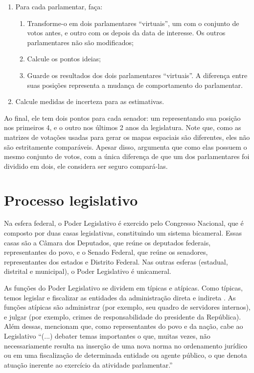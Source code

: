 \documentclass[a4paper,titlepage]{ppgi}\usepackage[]{graphicx}\usepackage[]{color}
\begin{document}
\begin{enumerate}
  \item Para cada parlamentar, faça:
    \begin{enumerate}
      \item Transforme-o em dois parlamentares ``virtuais'', um com o conjunto
de votos antes, e outro com os depois da data de interesse. Os outros
parlamentares não são modificados;
      \item Calcule os pontos ideias;
      \item Guarde os resultados dos dois parlamentares ``virtuais''. A
diferença entre suas posições representa a mudança de comportamento do
parlamentar.
    \end{enumerate}
  \item Calcule medidas de incerteza para as estimativas.
\end{enumerate}

Ao final, ele tem dois pontos para cada senador: um representando sua posição
nos primeiros 4, e o outro nos últimos 2 anos da legislatura. Note que, como as
matrizes de votações usadas para gerar os mapas espaciais são diferentes, eles
não são estritamente comparáveis. Apesar disso, 
argumenta que como elas possuem o mesmo conjunto de votos, com a única
diferença de que um dos parlamentares foi dividido em dois, ele considera ser
seguro compará-las.

\section{Processo legislativo}
\label{cap:fundamentacao:processo-legislativo}

Na esfera federal, o Poder Legislativo é exercido pelo Congresso Nacional, que
é composto por duas casas legislativas, constituindo um sistema bicameral. Essas
casas são a Câmara dos Deputados, que reúne os deputados federais,
representantes do povo, e o Senado Federal, que reúne os senadores,
representantes dos estados e Distrito Federal. Nas outras esferas (estadual,
distrital e municipal), o Poder Legislativo é unicameral.

As funções do Poder Legislativo se dividem em típicas e atípicas. Como típicas,
temos legislar \cite[arts. 48, 49, 51 e 52]{CF1988} e fiscalizar as entidades da
administração direta e indireta \cite[art. 70]{CF1988}. As funções atípicas são
administrar (por exemplo, seu quadro de servidores internos), e julgar (por
exemplo, crimes de responsabilidade do presidente da República). Além dessas,
 mencionam que, como representantes do povo e da
nação, cabe ao Legislativo ``(...) debater temas importantes o que, muitas
vezes, não necessariamente resulta na inserção de uma nova norma no ordenamento
jurídico ou em uma fiscalização de determinada entidade ou agente público, o
que denota atuação inerente ao exercício da atividade parlamentar.''
\end{document}
